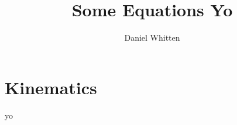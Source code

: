 \documentclass[]{article}
\title{Some Equations Yo}
\author{Daniel Whitten}
\begin{document}
\maketitle


\section{Kinematics}
yo
\end{document}
